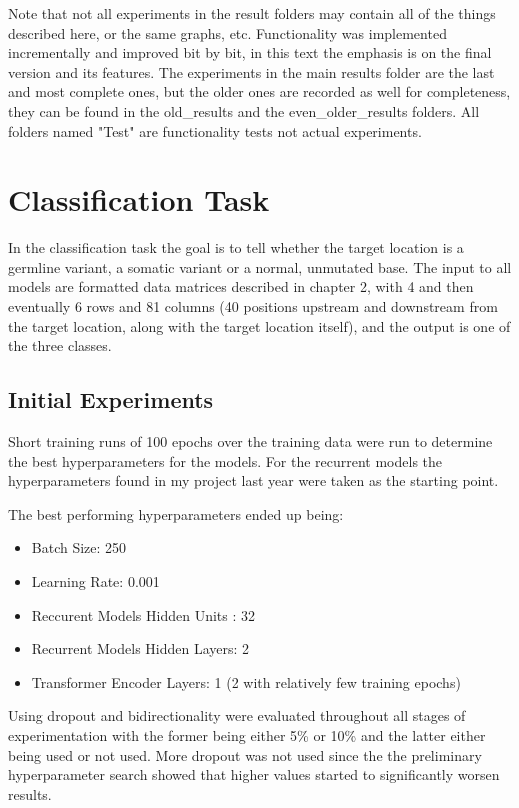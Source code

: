 \documentclass[bsc,frontabs,singlespacing,parskip,deptreport]{infthesis}
\begin{document}
Note that not all experiments in the result folders may contain all of the things described here, or the same graphs, etc. Functionality was implemented incrementally and improved bit by bit, in this text the emphasis is on the final version and its features. The experiments in the main results folder are the last and most complete ones, but the older ones are recorded as well for completeness, they can be found in the old\_results and the even\_older\_results folders. All folders named "Test" are functionality tests not actual experiments.

\section{Classification Task}

In the classification task the goal is to tell whether the target location is a germline variant, a somatic variant or a normal, unmutated base. The input to all models are formatted data matrices described in chapter 2, with 4 and then eventually 6 rows and 81 columns (40 positions upstream and downstream from the target location, along with the target location itself), and the output is one of the three classes.

\subsection{Initial Experiments}

Short training runs of 100 epochs over the training data were run to determine the best hyperparameters for the models. For the recurrent models the hyperparameters found in my project last year were taken as the starting point.

The best performing hyperparameters ended up being:

\begin{itemize}

\item Batch Size: 250 
\item Learning Rate: 0.001 
\item Reccurent Models Hidden Units : 32
\item Recurrent Models Hidden Layers: 2
\item Transformer Encoder Layers: 1 (2 with relatively few training epochs)

\end{itemize}

Using dropout and bidirectionality were evaluated throughout all stages of experimentation with the former being either 5\% or 10\% and the latter either being used or not used. More dropout was not used since the the preliminary hyperparameter search showed that higher values started to significantly worsen results.
\end{document}
